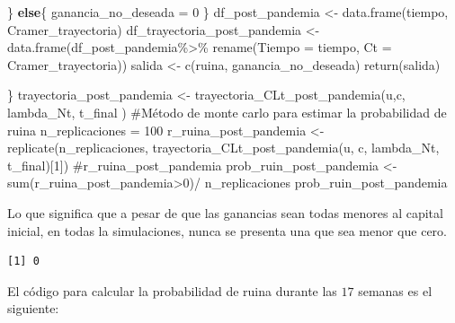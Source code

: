 \documentclass[
  us-letterpaper,
]{scrreprt}
\newenvironment{Shaded}{\begin{snugshade}}{\end{snugshade}}
\newcommand{\AttributeTok}[1]{\textcolor[rgb]{0.40,0.45,0.13}{#1}}
\newcommand{\CommentTok}[1]{\textcolor[rgb]{0.37,0.37,0.37}{#1}}
\newcommand{\ControlFlowTok}[1]{\textcolor[rgb]{0.00,0.23,0.31}{\textbf{#1}}}
\newcommand{\DecValTok}[1]{\textcolor[rgb]{0.68,0.00,0.00}{#1}}
\newcommand{\FunctionTok}[1]{\textcolor[rgb]{0.28,0.35,0.67}{#1}}
\newcommand{\NormalTok}[1]{\textcolor[rgb]{0.00,0.23,0.31}{#1}}
\newcommand{\OtherTok}[1]{\textcolor[rgb]{0.00,0.23,0.31}{#1}}
\newcommand{\SpecialCharTok}[1]{\textcolor[rgb]{0.37,0.37,0.37}{#1}}
\theoremstyle{definition}
\theoremstyle{plain}
\theoremstyle{plain}
\theoremstyle{remark}
\begin{document}
\begin{Shaded}
\begin{Highlighting}[]
\NormalTok{  \} }
  \ControlFlowTok{else}\NormalTok{\{}
\NormalTok{    ganancia\_no\_deseada }\OtherTok{=} \DecValTok{0}
\NormalTok{  \}}
\NormalTok{  df\_post\_pandemia }\OtherTok{\textless{}{-}} \FunctionTok{data.frame}\NormalTok{(tiempo, Cramer\_trayectoria)}
\NormalTok{  df\_trayectoria\_post\_pandemia }\OtherTok{\textless{}{-}} \FunctionTok{data.frame}\NormalTok{(df\_post\_pandemia}\SpecialCharTok{\%\textgreater{}\%} 
                                  \FunctionTok{rename}\NormalTok{(}\AttributeTok{Tiempo =}\NormalTok{ tiempo, }
                                  \AttributeTok{Ct =}\NormalTok{ Cramer\_trayectoria))}
\NormalTok{  salida }\OtherTok{\textless{}{-}} \FunctionTok{c}\NormalTok{(ruina, ganancia\_no\_deseada)}
  \FunctionTok{return}\NormalTok{(salida)}
  
\NormalTok{\}}
\NormalTok{trayectoria\_post\_pandemia }\OtherTok{\textless{}{-}} \FunctionTok{trayectoria\_CLt\_post\_pandemia}\NormalTok{(u,c,}
\NormalTok{                                            lambda\_Nt, t\_final )}
\CommentTok{\#Método de monte carlo para estimar la probabilidad de ruina}
\NormalTok{n\_replicaciones }\OtherTok{=} \DecValTok{100}
\NormalTok{r\_ruina\_post\_pandemia }\OtherTok{\textless{}{-}} \FunctionTok{replicate}\NormalTok{(n\_replicaciones,}
          \FunctionTok{trayectoria\_CLt\_post\_pandemia}\NormalTok{(u, c, lambda\_Nt, t\_final)[}\DecValTok{1}\NormalTok{])}
\CommentTok{\#r\_ruina\_post\_pandemia}
\NormalTok{prob\_ruin\_post\_pandemia }\OtherTok{\textless{}{-}} \FunctionTok{sum}\NormalTok{(r\_ruina\_post\_pandemia}\SpecialCharTok{\textgreater{}}\DecValTok{0}\NormalTok{)}\SpecialCharTok{/}
\NormalTok{n\_replicaciones}
\NormalTok{prob\_ruin\_post\_pandemia}
\end{Highlighting}
\end{Shaded}

Lo que significa que a pesar de que las ganancias sean todas menores al
capital inicial, en todas la simulaciones, nunca se presenta una que sea
menor que cero.

\begin{verbatim}
[1] 0
\end{verbatim}

El código para calcular la probabilidad de ruina durante las \(17\)
semanas es el siguiente:
\end{document}
